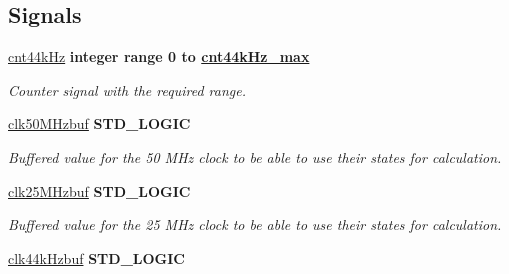 \subsection*{Signals}
 \begin{DoxyCompactItemize}
\item 
\hypertarget{classclk__divide_1_1clk__div__DAC_a119377ea25e90c9e0302742fb8d75456}{\hyperlink{classclk__divide_1_1clk__div__DAC_a119377ea25e90c9e0302742fb8d75456}{cnt44k\-Hz} {\bfseries \textcolor{comment}{integer}\textcolor{vhdlchar}{ }\textcolor{vhdlkeyword}{range}\textcolor{vhdlchar}{ } \textcolor{vhdldigit}{0} \textcolor{vhdlchar}{ }\textcolor{vhdlchar}{ }\textcolor{vhdlchar}{ }\textcolor{vhdlkeyword}{to}\textcolor{vhdlchar}{ }\textcolor{vhdlchar}{ }\textcolor{vhdlchar}{ }{\bfseries \hyperlink{classclk__divide_1_1clk__div__DAC_a8f64c0dba167ef17ec71f04787ff5a8a}{cnt44k\-Hz\-\_\-max}} \textcolor{vhdlchar}{ }} }\label{classclk__divide_1_1clk__div__DAC_a119377ea25e90c9e0302742fb8d75456}

\begin{DoxyCompactList}\small\item\em Counter signal with the required range. \end{DoxyCompactList}\item 
\hypertarget{classclk__divide_1_1clk__div__DAC_ab62cba3781d0056853b0d98ca65ea351}{\hyperlink{classclk__divide_1_1clk__div__DAC_ab62cba3781d0056853b0d98ca65ea351}{clk50\-M\-Hzbuf} {\bfseries \textcolor{comment}{S\-T\-D\-\_\-\-L\-O\-G\-I\-C}\textcolor{vhdlchar}{ }} }\label{classclk__divide_1_1clk__div__DAC_ab62cba3781d0056853b0d98ca65ea351}

\begin{DoxyCompactList}\small\item\em Buffered value for the 50 M\-Hz clock to be able to use their states for calculation. \end{DoxyCompactList}\item 
\hypertarget{classclk__divide_1_1clk__div__DAC_aaa88cd1782ca3c642feace13266e5f9f}{\hyperlink{classclk__divide_1_1clk__div__DAC_aaa88cd1782ca3c642feace13266e5f9f}{clk25\-M\-Hzbuf} {\bfseries \textcolor{comment}{S\-T\-D\-\_\-\-L\-O\-G\-I\-C}\textcolor{vhdlchar}{ }} }\label{classclk__divide_1_1clk__div__DAC_aaa88cd1782ca3c642feace13266e5f9f}

\begin{DoxyCompactList}\small\item\em Buffered value for the 25 M\-Hz clock to be able to use their states for calculation. \end{DoxyCompactList}\item 
\hypertarget{classclk__divide_1_1clk__div__DAC_a4b92d2406ba07f6283fa1d9ad64e472d}{\hyperlink{classclk__divide_1_1clk__div__DAC_a4b92d2406ba07f6283fa1d9ad64e472d}{clk44k\-Hzbuf} {\bfseries \textcolor{comment}{S\-T\-D\-\_\-\-L\-O\-G\-I\-C}\textcolor{vhdlchar}{ }} }\label{classclk__divide_1_1clk__div__DAC_a4b92d2406ba07f6283fa1d9ad64e472d}


\end{DoxyCompactItemize}

